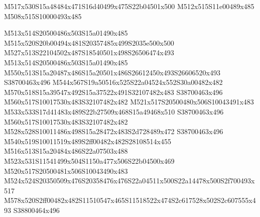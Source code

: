 \documentclass{article}
\begin{document}
\begin{multicols}{2}






\begin{center}
M517x530S15a48484x471S16d40499x475S22b04501x500 M512x515S11e00489x485 M508x515S10000493x485 
\end{center}




M513x514S20500486x503S15a01490x485 M515x520S20b00494x481S20357485x499S2035e500x500 M527x513S22104502x487S18540501x498S26506474x493 M513x514S20500486x503S15a01490x485 M550x513S15a20487x486S15a20501x486S26612450x493S26606520x493 S38700463x496 M544x567S19a50516x525S22a04524x552S30a00482x482 M570x518S15a39547x492S15a37522x491S32107482x483 S38700463x496 M560x517S10017530x483S32107482x482 M521x517S20500480x506S10043491x483 M533x533S17d41483x489S22b27509x468S15a49468x510 S38700463x496 M560x517S10017530x483S32107482x482 M528x528S10011486x498S15a28472x483S2d728489x472 S38700463x496 M540x519S10011519x489S2ff00482x482S28108514x455 M516x513S15a20484x486S22a07503x488 M523x531S11541499x504S1150a477x506S22b04500x469 M520x517S20500481x506S10043490x483 M524x524S20350509x476S20358476x476S22a04511x500S22a14478x500S2f700493x517 M578x520S2ff00482x482S11510547x465S11518522x474S2c617528x502S2c607555x493 S38800464x496



\end{multicols}
\end{document}
